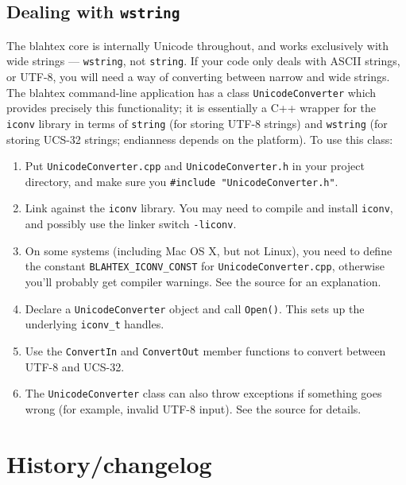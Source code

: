 \documentclass{article}
\begin{document}
\subsection{Dealing with \texttt{wstring}}

The blahtex core is internally Unicode throughout, and works exclusively with wide strings --- \texttt{wstring}, not \texttt{string}. If your code only deals with ASCII strings, or UTF-8, you will need a way of converting between narrow and wide strings. The blahtex command-line application has a class \texttt{UnicodeConverter} which provides precisely this functionality; it is essentially a C++ wrapper for the \texttt{iconv} library in terms of \texttt{string} (for storing UTF-8 strings) and \texttt{wstring} (for storing UCS-32 strings; endianness depends on the platform). To use this class:
\begin{enumerate}
\item Put \texttt{UnicodeConverter.cpp} and \texttt{UnicodeConverter.h} in your project directory, and make sure you \texttt{\#include "UnicodeConverter.h"}.
\item Link against the \texttt{iconv} library. You may need to compile and install \texttt{iconv}, and possibly use the linker switch \texttt{-liconv}.
\item On some systems (including Mac OS X, but not Linux), you need to define the constant \texttt{BLAHTEX\_ICONV\_CONST} for \texttt{UnicodeConverter.cpp}, otherwise you'll probably get compiler warnings. See the source for an explanation.
\item Declare a \texttt{UnicodeConverter} object and call \texttt{Open()}. This sets up the underlying \texttt{iconv\_t} handles.
\item Use the \texttt{ConvertIn} and \texttt{ConvertOut} member functions to convert between UTF-8 and UCS-32.
\item The \texttt{UnicodeConverter} class can also throw exceptions if something goes wrong (for example, invalid UTF-8 input). See the source for details.
\end{enumerate}

\section{History/changelog}\label{sec:history}
\end{document}
